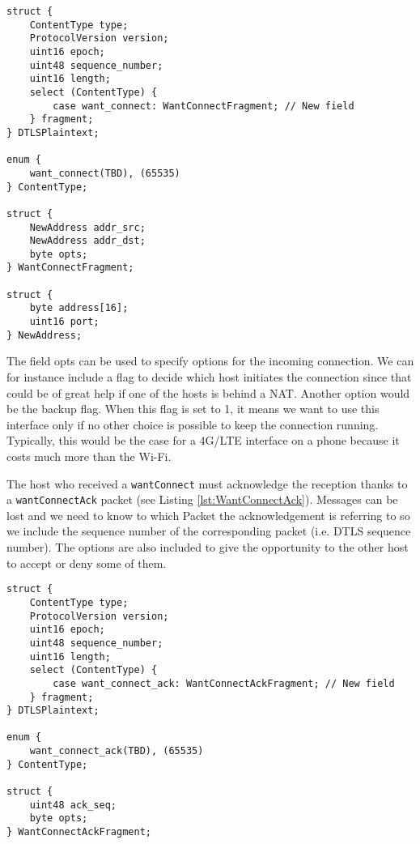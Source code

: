 \begin{lstlisting}[caption= WantConnect message structure, label=lst:WantConnect]
struct {
    ContentType type;
    ProtocolVersion version;
    uint16 epoch;
    uint48 sequence_number;
    uint16 length;
    select (ContentType) {
        case want_connect: WantConnectFragment; // New field
    } fragment;
} DTLSPlaintext;

enum {
    want_connect(TBD), (65535)
} ContentType;

struct {
    NewAddress addr_src;
    NewAddress addr_dst;
    byte opts;
} WantConnectFragment;

struct {
    byte address[16];
    uint16 port;
} NewAddress;
\end{lstlisting}

The field opts can be used to specify options for the incoming connection.  We can for instance include a flag to decide which host initiates the connection since that could be of great help if one of the hosts is behind a NAT. Another option would be the backup flag. When this flag is set to 1, it means we want to use this interface only if no other choice is possible to keep the connection running. Typically, this would be the case for a 4G/LTE interface on a phone because it costs much more than the Wi-Fi.

The host who received a \verb!wantConnect! must acknowledge the reception thanks to a \verb!wantConnectAck! packet (see Listing \ref{lst:WantConnectAck}). Messages can be lost and we need to know to which Packet the acknowledgement is referring to so we include the sequence number of the corresponding packet (i.e. DTLS sequence number). The options are also included to give the opportunity to the other host to accept or deny some of them.

\begin{lstlisting}[caption= wantConnectAck message structure, label=lst:WantConnectAck]
struct {
    ContentType type;
    ProtocolVersion version;
    uint16 epoch;
    uint48 sequence_number;
    uint16 length;
    select (ContentType) {
        case want_connect_ack: WantConnectAckFragment; // New field
    } fragment;
} DTLSPlaintext;

enum {
    want_connect_ack(TBD), (65535)
} ContentType;

struct {
    uint48 ack_seq;
    byte opts;
} WantConnectAckFragment;
\end{lstlisting}

